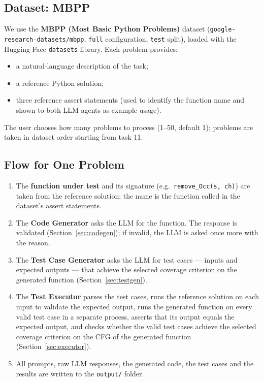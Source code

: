 \documentclass[12pt, a4paper]{article}
\begin{document}
\subsection{Dataset: MBPP}

We use the \textbf{MBPP (Most Basic Python Problems)} dataset (\texttt{google-research-datasets/mbpp}, \texttt{full} configuration, \texttt{test} split), loaded with the Hugging Face \texttt{datasets} library. Each problem provides:
\begin{itemize}
    \item a natural-language description of the task;
    \item a reference Python solution;
    \item three reference assert statements (used to identify the function name and shown to both LLM agents as example usage).
\end{itemize}
The user chooses how many problems to process (1--50, default 1); problems are taken in dataset order starting from task 11.

\subsection{Flow for One Problem}

\begin{enumerate}
    \item The \textbf{function under test} and its signature (e.g.\ \texttt{remove\_Occ(s, ch)}) are taken from the reference solution; the name is the function called in the dataset's assert statements.
    \item The \textbf{Code Generator} asks the LLM for the function. The response is validated (Section~\ref{sec:codegen}); if invalid, the LLM is asked once more with the reason.
    \item The \textbf{Test Case Generator} asks the LLM for test cases --- inputs and expected outputs --- that achieve the selected coverage criterion on the generated function (Section~\ref{sec:testgen}).
    \item The \textbf{Test Executor} parses the test cases, runs the reference solution on each input to validate the expected output, runs the generated function on every valid test case in a separate process, asserts that its output equals the expected output, and checks whether the valid test cases achieve the selected coverage criterion on the CFG of the generated function (Section~\ref{sec:executor}).
    \item All prompts, raw LLM responses, the generated code, the test cases and the results are written to the \texttt{output/} folder.
\end{enumerate}
\end{document}
